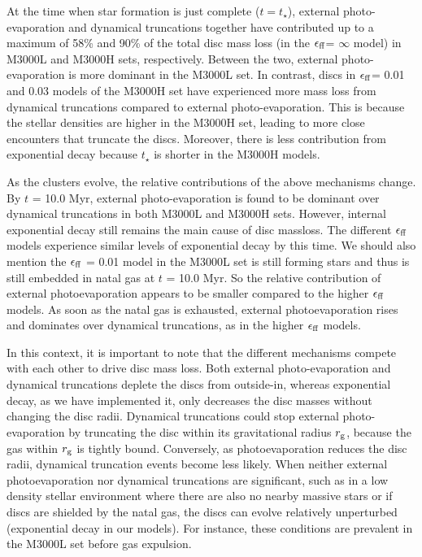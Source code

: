 \documentclass[fleqn,usenatbib]{mnras}
\newcommand\sfeff{\ensuremath{\epsilon_{\rm ff}}\xspace}   %
\begin{document}
At the time when star formation is just complete ($t=t_\star$), external photo-evaporation and dynamical truncations together have contributed up to a maximum of 58\% and 90\% of the total disc mass loss (in the \sfeff = $\infty$ model) in M3000L and M3000H sets, respectively. Between the two, external photo-evaporation is more dominant in the M3000L set. In contrast, discs in \sfeff = 0.01 and 0.03 models of the M3000H set have experienced more mass loss from dynamical truncations compared to external photo-evaporation. This is because the stellar densities are higher in the M3000H set, leading to more close encounters that truncate the discs. Moreover, there is less contribution from exponential decay because $t_\star$ is shorter in the M3000H models. 

As the clusters evolve, the relative contributions of the above mechanisms change. By $t$ = 10.0 Myr, external photo-evaporation is found to be dominant over dynamical truncations in both M3000L and M3000H sets. However, internal exponential decay still remains the main cause of disc massloss. The different $\epsilon_{\rm ff}$ models experience similar levels of exponential decay by this time. We should also mention the $\epsilon_{\rm ff}$ = 0.01 model in the M3000L set is still forming stars and thus is still embedded in natal gas at $t$ = 10.0 Myr. So the relative contribution of external photoevaporation appears to be smaller compared to the higher $\epsilon_{\rm ff}$ models. As soon as the natal gas is exhausted, external photoevaporation rises and dominates over dynamical truncations, as in the higher \sfeff models.

In this context, it is important to note that the different mechanisms compete with each other to drive disc mass loss. Both external photo-evaporation and dynamical truncations deplete the discs from outside-in, whereas exponential decay, as we have implemented it, only decreases the disc masses without changing the disc radii. Dynamical truncations could stop external photo-evaporation by truncating the disc within its gravitational radius $r_{\rm g}$, because the gas within $r_{\rm g}$ is tightly bound. Conversely, as photoevaporation reduces the disc radii, dynamical truncation events become less likely. When neither external photoevaporation nor dynamical truncations are significant, such as in a low density stellar environment where there are also no nearby massive stars or if discs are shielded by the natal gas, the discs can evolve relatively unperturbed (exponential decay in our models). For instance, these conditions are prevalent in the M3000L set before gas expulsion. 
\end{document}

